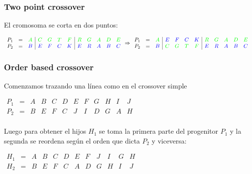 \documentclass[10pt,a4paper]{article}
\begin{document}
\subsubsection*{Two point crossover}

El cromosoma se corta en dos puntos:

\begin{center}
$\begin{array}{ccc|cccc|ccccc} P_1 &= &\color{green} A&\color{green}C&\color{green}G&\color{green}T&\color{green}F&\color{green}R&\color{green}G&\color{green}A&\color{green}D&\color{green}E\\ P_2 &= & \color{blue}B&\color{blue}E&\color{blue}F&\color{blue}C&\color{blue}K&\color{blue}E&\color{blue}R&\color{blue}A&\color{blue}B&\color{blue}C\\ \end{array} \Rightarrow \begin{array}{ccc|cccc|ccccc} P_1 &= &\color{green} A&\color{blue}E&\color{blue}F&\color{blue}C&\color{blue}K&\color{green}R&\color{green}G&\color{green}A&\color{green}D&\color{green}E\\ P_2 &= & \color{blue}B&\color{green}C&\color{green}G&\color{green}T&\color{green}F&\color{blue}E&\color{blue}R&\color{blue}A&\color{blue}B&\color{blue}C\\ \end{array}$
\end{center}

\subsubsection*{Order based crossover}

Comenzamos trazando una línea como en el crossover simple

\begin{center}
$\begin{array}{cccccc|cccccc} P_1 &= &A&B&C&D&E&F&G&H&I&J\\ P_2 &= & B&E&F&C&J&I&D&G&A&H\\ \end{array}$
\end{center}

Luego para obtener el hijos $H_1$ se toma la primera parte del progenitor $P_1$ y la segunda se reordena según el orden que dicta $P_2$ y viceversa:

\begin{center}
$\begin{array}{cccccc|cccccc} H_1 &= &A&B&C&D&E&F&J&I&G&H\\ H_2 &= & B&E&F&C&A&D&G&H&I&J\\ \end{array}$
\end{center}
\end{document}
